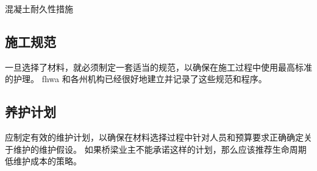 \begin{table}
  \caption{混凝土耐久性措施}
  \label{tab:concrete-durability-strategies}
  
\end{table}

\subsection{施工规范}
一旦选择了材料，就必须制定一套适当的规范，以确保在施工过程中使用最高标准的护理。 \gls*{fhwa} 和各州机构已经很好地建立并记录了这些规范和程序。


\subsection{养护计划}
应制定有效的维护计划，以确保在材料选择过程中针对人员和预算要求正确确定关于维护的维护假设。 如果桥梁业主不能承诺这样的计划，那么应该推荐生命周期低维护成本的策略。